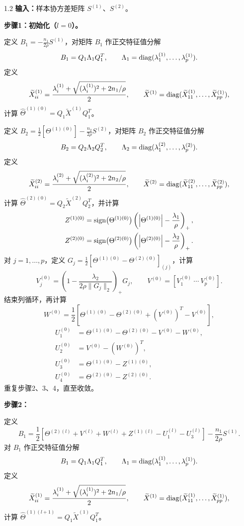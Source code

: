 \begin{bookalgorithm}{1.2}
\textbf{输入：}样本协方差矩阵 $S^{(1)}$、$S^{(2)}$。

\textbf{步骤1：初始化（$l=0$）。}

定义 $B_1=-\frac{n_1}{2\rho}S^{(1)}$，对矩阵 $B_1$ 作正交特征值分解
\[
B_1=Q_1\Lambda_1Q_1^T,\qquad \Lambda_1=\operatorname{diag}(\lambda_1^{(1)},\ldots,\lambda_p^{(1)}).
\]
定义
\[
\widetilde X_{ii}^{(1)}=\frac{\lambda_i^{(1)}+\sqrt{(\lambda_i^{(1)})^2+2n_1/\rho}}2,
\qquad \widetilde X^{(1)}=\operatorname{diag}(\widetilde X_{11}^{(1)},\ldots,\widetilde X_{pp}^{(1)}),
\]
计算 $\widehat\Theta^{(1)(0)}=Q_1\widetilde X^{(1)}Q_1^T$。

定义 $B_2=\frac12[\Theta^{(1)(0)}]-\frac{n_2}{2\rho}S^{(2)}$，对矩阵 $B_2$ 作正交特征值分解
\[
B_2=Q_2\Lambda_2Q_2^T,\qquad \Lambda_2=\operatorname{diag}(\lambda_1^{(2)},\ldots,\lambda_p^{(2)}).
\]
定义
\[
\widetilde X_{ii}^{(2)}=\frac{\lambda_i^{(2)}+\sqrt{(\lambda_i^{(2)})^2+2n_2/\rho}}2,
\qquad \widetilde X^{(2)}=\operatorname{diag}(\widetilde X_{11}^{(2)},\ldots,\widetilde X_{pp}^{(2)}),
\]
计算 $\widehat\Theta^{(2)(0)}=Q_2\widetilde X^{(2)}Q_2^T$，并计算
\[
\begin{aligned}
Z^{(1)(0)}&=\operatorname{sign}\bigl(\Theta^{(1)(0)}\bigr)
\left(\left|\Theta^{(1)(0)}\right|-\frac{\lambda_1}\rho\right)_+,\\
Z^{(2)(0)}&=\operatorname{sign}\bigl(\Theta^{(2)(0)}\bigr)
\left(\left|\Theta^{(2)(0)}\right|-\frac{\lambda_2}\rho\right)_+.
\end{aligned}
\]
对 $j=1,\ldots,p$，定义 $G_j=\frac12[\Theta^{(1)(0)}-\Theta^{(2)(0)}]_{(j)}$，计算
\[
V_j^{(0)}=\left(1-\frac{\lambda_2}{2\rho\|G_j\|_2}\right)_+G_j,
\qquad V^{(0)}=[V_1^{(0)}\ \cdots\ V_p^{(0)}].
\]
结束列循环，再计算
\[
W^{(0)}=\frac12\left[\Theta^{(1)(0)}-\Theta^{(2)(0)}+(V^{(0)})^T-V^{(0)}\right],
\]
\[
\begin{aligned}
U_1^{(0)}&=\Theta^{(1)(0)}-\Theta^{(2)(0)}-V^{(0)}-W^{(0)},\\
U_2^{(0)}&=V^{(0)}-(W^{(0)})^T,\\
U_3^{(0)}&=\Theta^{(1)(0)}-Z^{(1)(0)},\\
U_4^{(0)}&=\Theta^{(2)(0)}-Z^{(2)(0)}.
\end{aligned}
\]
重复步骤2、3、4，直至收敛。

\textbf{步骤2：}

定义
\[
B_1=\frac12\left[\Theta^{(2)(l)}+V^{(l)}+W^{(l)}+Z^{(1)(l)}-U_1^{(l)}-U_3^{(l)}\right]
-\frac{n_1}{2\rho}S^{(1)}.
\]
对 $B_1$ 作正交特征值分解
\[
B_1=Q_1\Lambda_1Q_1^T,\qquad \Lambda_1=\operatorname{diag}(\lambda_1^{(1)},\ldots,\lambda_p^{(1)}).
\]
定义
\[
\widetilde X_{ii}^{(1)}=\frac{\lambda_i^{(1)}+\sqrt{(\lambda_i^{(1)})^2+2n_1/\rho}}2,
\qquad \widetilde X^{(1)}=\operatorname{diag}(\widetilde X_{11}^{(1)},\ldots,\widetilde X_{pp}^{(1)}),
\]
计算 $\widehat\Theta^{(1)(l+1)}=Q_1\widetilde X^{(1)}Q_1^T$。


\end{bookalgorithm}
